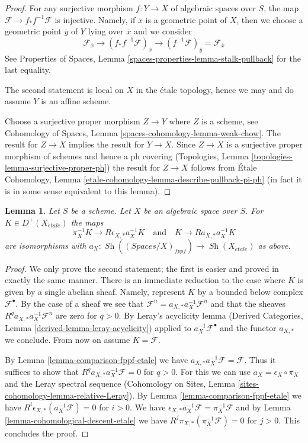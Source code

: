 \documentclass{stacks-project}
\theoremstyle{plain}
\newtheorem{lemma}[subsection]{Lemma}
\theoremstyle{definition}
\theoremstyle{remark}
\numberwithin{equation}{subsection}
\def\Sh{\mathop{\mathit{Sh}}\nolimits}
\def\etale{{\acute{e}tale}}
\begin{document}
\begin{proof}
For any surjective morphism $f : Y \to X$ of algebraic spaces over $S$,
the map $\mathcal{F} \to f_*f^{-1}\mathcal{F}$ is injective.
Namely, if $\overline{x}$ is a geometric point of $X$, then we
choose a geometric point $\overline{y}$ of $Y$ lying over $\overline{x}$
and we consider
$$
\mathcal{F}_{\overline{x}} \to
(f_*f^{-1}\mathcal{F})_{\overline{x}} \to
(f^{-1}\mathcal{F})_{\overline{y}} = \mathcal{F}_{\overline{x}}
$$
See Properties of Spaces, Lemma \ref{spaces-properties-lemma-stalk-pullback}
for the last equality.

\medskip\noindent
The second statement is local on $X$ in the \'etale topology, hence we may
and do assume $Y$ is an affine scheme.

\medskip\noindent
Choose a surjective proper morphism $Z \to Y$ where $Z$ is a scheme, see
Cohomology of Spaces, Lemma \ref{spaces-cohomology-lemma-weak-chow}.
The result for $Z \to X$ implies the result for $Y \to X$.
Since $Z \to X$ is a surjective proper morphism of schemes
and hence a ph covering
(Topologies, Lemma \ref{topologies-lemma-surjective-proper-ph})
the result for $Z \to X$ follows from
\'Etale Cohomology, Lemma \ref{etale-cohomology-lemma-describe-pullback-pi-ph}
(in fact it is in some sense equivalent to this lemma).
\end{proof}

\begin{lemma}
\label{lemma-cohomological-descent-etale-fppf}
Let $S$ be a scheme. Let $X$ be an algebraic space over $S$.
For $K \in D^+(X_\etale)$ the maps
$$
\pi_X^{-1}K \longrightarrow R\epsilon_{X, *}a_X^{-1}K
\quad\text{and}\quad
K \longrightarrow Ra_{X, *}a_X^{-1}K
$$
are isomorphisms with
$a_X : \Sh((\textit{Spaces}/X)_{fppf}) \to \Sh(X_\etale)$ as above.
\end{lemma}

\begin{proof}
We only prove the second statement; the first is easier and proved in exactly
the same manner.
There is an immediate reduction to the case where
$K$ is given by a single abelian sheaf. Namely, represent $K$
by a bounded below complex $\mathcal{F}^\bullet$. By the case of a
sheaf we see that
$\mathcal{F}^n = a_{X, *} a_X^{-1} \mathcal{F}^n$
and that the sheaves $R^qa_{X, *}a_X^{-1}\mathcal{F}^n$
are zero for $q > 0$. By Leray's acyclicity lemma
(Derived Categories, Lemma \ref{derived-lemma-leray-acyclicity})
applied to $a_X^{-1}\mathcal{F}^\bullet$
and the functor $a_{X, *}$ we conclude. From now on assume $K = \mathcal{F}$.

\medskip\noindent
By Lemma \ref{lemma-comparison-fppf-etale} we have
$a_{X, *}a_X^{-1}\mathcal{F} = \mathcal{F}$. Thus it suffices to show that
$R^qa_{X, *}a_X^{-1}\mathcal{F} = 0$ for $q > 0$.
For this we can use $a_X = \epsilon_X \circ \pi_X$ and
the Leray spectral sequence
(Cohomology on Sites, Lemma \ref{sites-cohomology-lemma-relative-Leray}).
By Lemma \ref{lemma-comparison-fppf-etale}
we have $R^i\epsilon_{X, *}(a_X^{-1}\mathcal{F}) = 0$ for $i > 0$.
We have
$\epsilon_{X, *}a_X^{-1}\mathcal{F} = \pi_X^{-1}\mathcal{F}$
and by Lemma \ref{lemma-cohomological-descent-etale} we have
$R^j\pi_{X, *}(\pi_X^{-1}\mathcal{F}) = 0$ for $j > 0$.
This concludes the proof.
\end{proof}
\end{document}
